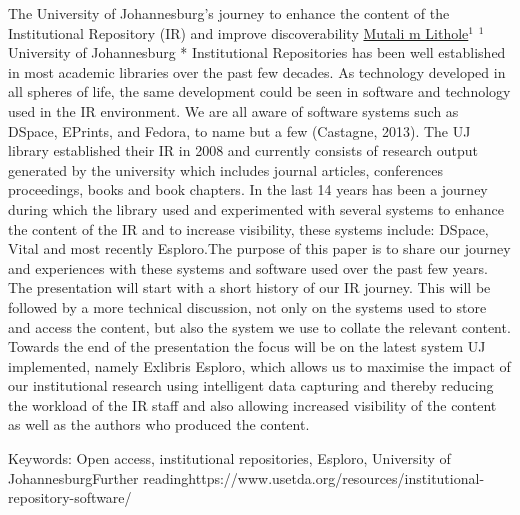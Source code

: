 
    \begin{abstract_online}{ The University of Johannesburg’s journey to enhance the content of the Institutional Repository (IR) and improve discoverability}{%
        \underline{ Mutali m Lithole}$^{1}$}{%
        }{%
        $^1$  University of Johannesburg *\newline{}
            }
	Institutional Repositories has been well established in most academic libraries over the past few decades. As technology developed in all spheres of life, the same development could be seen in software and technology used in the IR environment. We are all aware of software systems such as DSpace, EPrints, and Fedora, to name but a few (Castagne, 2013).  The UJ library established their IR in 2008 and currently consists of research output generated by the university which includes journal articles, conferences proceedings, books and book chapters. In the last 14 years has been a journey during which the library used and experimented with several systems to enhance the content of the IR and to increase visibility, these systems include: DSpace, Vital and most recently Esploro.The purpose of this paper is to share our journey and experiences with these systems and software used over the past few years. The presentation will start with a short history of our IR journey. This will be followed by a more technical discussion, not only on the systems used to store and access the content, but also the system we use to collate the relevant content. Towards the end of the presentation the focus will be on the latest system UJ implemented, namely Exlibris Esploro, which allows us to maximise the impact of our institutional research using intelligent data capturing and thereby reducing the workload of the IR staff and also allowing increased visibility of the content as well as the authors who produced the content.
	
	Keywords: Open access, institutional repositories, Esploro, University of JohannesburgFurther readinghttps://www.usetda.org/resources/institutional-repository-software/
    \end{abstract_online}
    

